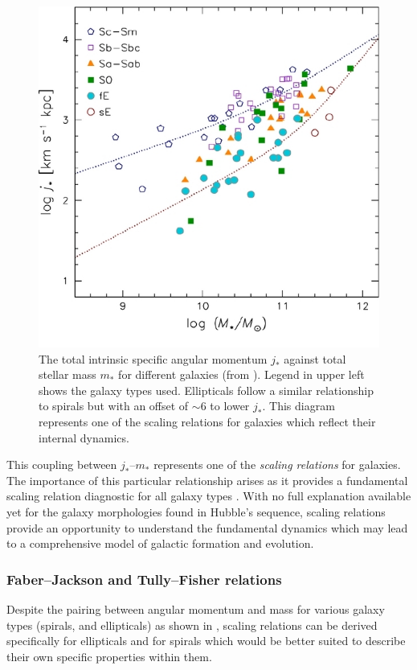 \documentclass[12pt, twocolumn, nofootinbib]{revtex4-1}    %
\begin{document}
\begin{figure}
\includegraphics[width=1.0\linewidth]{introduction/romanowsky_2012_fig_3}
\caption{The total intrinsic specific angular momentum $j_*$ against total stellar mass $m_*$ for different galaxies (from \citealt{2012ApJS..203...17R}). Legend in upper left shows the galaxy types used. Ellipticals follow a similar relationship to spirals but with an offset of $\sim6$ to lower $j_*$. This diagram represents one of the scaling relations for galaxies which reflect their internal dynamics.}
\label{fig:romanowsky_fall_2012}
\end{figure}

This coupling between $j_*$--$m_*$ represents one of the \textit{scaling relations} for galaxies. The importance of this particular relationship arises as it provides a fundamental scaling relation diagnostic for all galaxy types \citep{2012ApJS..203...17R}. With no full explanation available yet for the galaxy morphologies found in Hubble's sequence, scaling relations provide an opportunity to understand the fundamental dynamics which may lead to a comprehensive model of galactic formation and evolution.

\vspace{2ex} %
\subsubsection{Faber--Jackson and Tully--Fisher relations}
\noindent
Despite the pairing between angular momentum and mass for various galaxy types (spirals, and ellipticals) as shown in \cite{2012ApJS..203...17R}, scaling relations can be derived specifically for ellipticals and for spirals which would be better suited to describe their own specific properties within them.  
\end{document}
